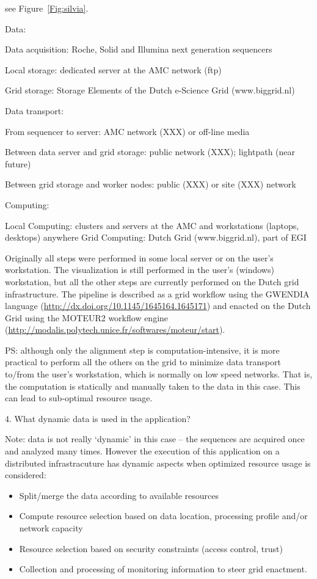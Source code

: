 \documentclass[preprint,12pt]{article}
\begin{document}
see Figure~\ref{Fig:silvia}.

Data:

Data acquisition: Roche, Solid and Illumina next generation sequencers

Local storage: dedicated server at the AMC network (ftp)

Grid storage: Storage Elements of the Dutch e-Science Grid (www.biggrid.nl)

Data transport:

From sequencer to server: AMC network (XXX) or off-line media

Between data server and grid storage: public network (XXX);  lightpath (near future)

Between grid storage and worker nodes: public (XXX) or site (XXX) network

Computing:

Local Computing: clusters and servers at the AMC and workstations (laptops, desktops) anywhere
Grid Computing: Dutch Grid (www.biggrid.nl), part of EGI

Originally all steps were performed in some local server or on the user's workstation. The visualization is still performed in the user's (windows) workstation, but all the other steps are currently performed on the Dutch grid infrastructure. The pipeline is described as a grid workflow using the GWENDIA language (\url{http://dx.doi.org/10.1145/1645164.1645171}) and enacted on the Dutch Grid using the MOTEUR2 workflow engine (\url{http://modalis.polytech.unice.fr/softwares/moteur/start}).

PS: although only the alignment step is computation-intensive, it is more practical to perform all the others on the grid to minimize data transport to/from the user's workstation, which is normally on low speed networks. That is, the computation is statically and manually taken to the data in this case. This can lead to sub-optimal resource usage.

4. What dynamic data is used in the application?

Note: data is not really `dynamic' in this case -- the sequences are acquired once and analyzed many times. However the execution of this application on a distributed infrastracuture has dynamic aspects when optimized resource usage is considered:

\begin{itemize}
\item Split/merge the data according to available resources
\item Compute resource selection based on data location, processing profile and/or network capacity
\item Resource selection based on security constraints (access control, trust)
\item Collection and processing of monitoring information to steer grid enactment.
\end{itemize}
\end{document}
